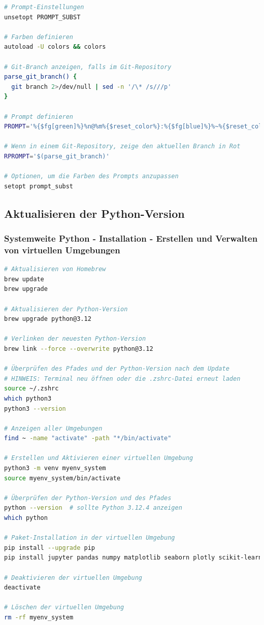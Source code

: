 \documentclass{vorlage-design-main}
\begin{document}
\begin{lstlisting}[language=bash]
# Prompt-Einstellungen
unsetopt PROMPT_SUBST

# Farben definieren
autoload -U colors && colors

# Git-Branch anzeigen, falls im Git-Repository
parse_git_branch() {
  git branch 2>/dev/null | sed -n '/\* /s///p'
}

# Prompt definieren
PROMPT='%{$fg[green]%}%n@%m%{$reset_color%}:%{$fg[blue]%}%~%{$reset_color%}$(parse_git_branch) $ '

# Wenn in einem Git-Repository, zeige den aktuellen Branch in Rot
RPROMPT='$(parse_git_branch)'

# Optionen, um die Farben des Prompts anzupassen
setopt prompt_subst
\end{lstlisting}

\subsection{Aktualisieren der
Python-Version}\label{aktualisieren-der-python-version}

\subsubsection{Systemweite Python - Installation - Erstellen und
Verwalten von virtuellen
Umgebungen}\label{systemweite-python---installation---erstellen-und-verwalten-von-virtuellen-umgebungen}

\begin{lstlisting}[language=bash]
# Aktualisieren von Homebrew
brew update
brew upgrade

# Aktualisieren der Python-Version
brew upgrade python@3.12

# Verlinken der neuesten Python-Version
brew link --force --overwrite python@3.12

# Überprüfen des Pfades und der Python-Version nach dem Update
# HINWEIS: Terminal neu öffnen oder die .zshrc-Datei erneut laden
source ~/.zshrc
which python3
python3 --version

# Anzeigen aller Umgebungen
find ~ -name "activate" -path "*/bin/activate"

# Erstellen und Aktivieren einer virtuellen Umgebung
python3 -m venv myenv_system
source myenv_system/bin/activate

# Überprüfen der Python-Version und des Pfades
python --version  # sollte Python 3.12.4 anzeigen
which python

# Paket-Installation in der virtuellen Umgebung
pip install --upgrade pip
pip install jupyter pandas numpy matplotlib seaborn plotly scikit-learn scipy pyqt5

# Deaktivieren der virtuellen Umgebung
deactivate

# Löschen der virtuellen Umgebung
rm -rf myenv_system
\end{lstlisting}
\end{document}
